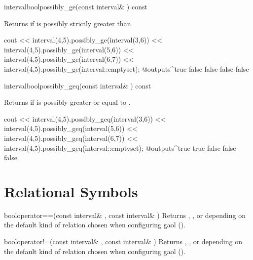 \documentclass{manual}
\let\geq=\geqslant
\begin{document}
\begin{defmethod}{interval}{bool}{possibly\_ge}{(const interval\& ) const}
  \begin{operation}
  \end{operation}
  Returns  if  is possibly strictly greater than 
  \begin{example}
cout << interval(4,5).possibly_ge(interval(3,6))
     << interval(4,5).possibly_ge(interval(5,6))
     << interval(4,5).possibly_ge(interval(6,7))
     << interval(4,5).possibly_ge(interval::emptyset);
@outputs^true false false false false~
  \end{example}
\end{defmethod}

\begin{defmethod}{interval}{bool}{possibly\_geq}{(const interval\& ) const}
  \begin{operation}
    \op{$\exists x\in \code{self}, \exists y \in \var{I}\colon x\geq y$}
  \end{operation}
  Returns  if  is possibly greater or equal to .
  \begin{example}
cout << interval(4,5).possibly_geq(interval(3,6))
     << interval(4,5).possibly_geq(interval(5,6))
     << interval(4,5).possibly_geq(interval(6,7))
     << interval(4,5).possibly_geq(interval::emptyset);
@outputs^true true false false false~
  \end{example}
\end{defmethod}

\section{Relational Symbols}

\begin{deffun}{bool}{operator==}{(const interval\& , const interval\& )}
    Returns ,
    , or
     depending on the default kind of
    relation chosen when configuring gaol ().
\end{deffun}

\begin{deffun}{bool}{operator!=}{(const interval\& , const interval\& )}
  Returns ,
  , or
   depending on the default kind of
  relation chosen when configuring gaol ().
\end{deffun}
\end{document}
